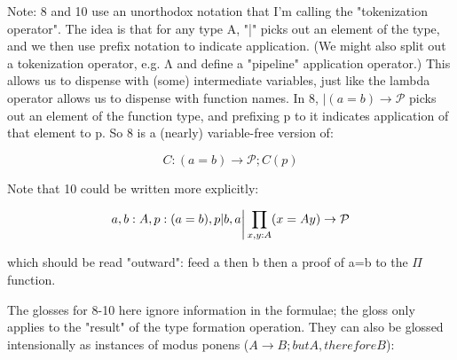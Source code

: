 \documentclass{article}
\begin{document}


Note: 8 and 10 use an unorthodox notation that I'm calling the
"tokenization operator".  The idea is that for any type A, "|" picks
out an element of the type, and we then use prefix notation to
indicate application. (We might also split out a tokenization
operator, e.g. Λ and define a "pipeline" application operator.)  This
allows us to dispense with (some) intermediate variables, just like
the lambda operator allows us to dispense with function names.  In
8, \(|(a=b)\to\mathcal{P}\) picks out an element of the function type,
and prefixing p to it indicates application of that element to p.  So
8 is a (nearly) variable-free version of:

    \[C:(a=b)\to\mathcal{P}; C(p)\]

Note that 10 could be written more explicitly:

\[a,b:A, p:(a=b), p\rvert b,a\raisebox{-4pt}{\(\biggr\rvert\)}\prod\limits_{x,y:A}(x=Ay)\to\mathcal{P}\]


which should be read "outward": feed a then b then a proof of a=b to the \(\Pi\) function.

The glosses for 8-10 here ignore information in the formulae; the gloss only applies to the "result" of the type formation operation.  They can also be glossed intensionally as instances of modus ponens
(\(A\to B; but A, therefore B\)):
\end{document}
